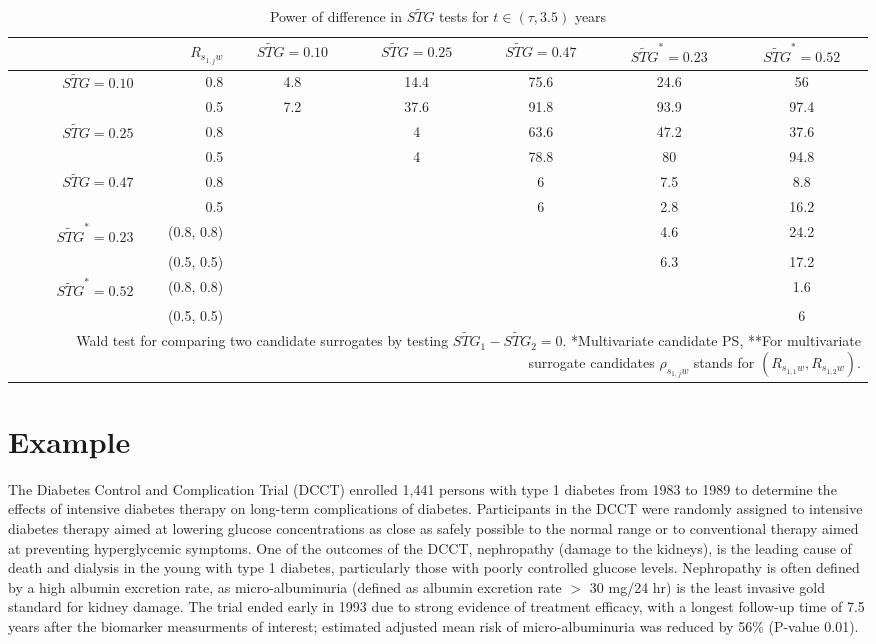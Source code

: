 \documentclass[times, doublespace]{simauth}
\begin{document}
\begin{table}
\begin{center}
\caption{Power of difference in $\widetilde{STG}$ tests for $t \in (\tau, 3.5)$ years \label{IPow}}
\begin{tabular}{rrccccc}
  \hline
 & $R_{s_{1,j}w}$ & $\widetilde{STG}=0.10$  & $\widetilde{STG}=0.25$  & $\widetilde{STG}=0.47$& $\widetilde{STG}^*=0.23$  & $\widetilde{STG}^*=0.52$\\
  \hline
$\widetilde{STG}=0.10$ & 0.8 & 4.8 & 14.4 & 75.6 & 24.6 & 56 \\ 
&  0.5  & 7.2 & 37.6 & 91.8 & 93.9 & 97.4 \\ 
 $\widetilde{STG}=0.25$ & 0.8 &  & 4 & 63.6 & 47.2 & 37.6 \\ 
&  0.5 &  & 4 & 78.8 & 80 & 94.8 \\ 
$\widetilde{STG}=0.47$ & 0.8 &  &  & 6 & 7.5 & 8.8 \\ 
 & 0.5 &  &  & 6 & 2.8 & 16.2 \\ 
$\widetilde{STG}^{*}=0.23$ & (0.8, 0.8) &  &  &  & 4.6 & 24.2 \\ 
&  (0.5, 0.5) &  &  &  & 6.3 & 17.2 \\ 
$\widetilde{STG}^{*}=0.52$ & (0.8, 0.8) &  &  &  &  & 1.6 \\ 
 & (0.5, 0.5) &  &  &  &  & 6 \\ 
   \hline
\multicolumn{7}{p{9in}}{Wald test for comparing two candidate surrogates by testing $\widetilde{STG}_1-\widetilde{STG}_2=0$. *Multivariate candidate PS, **For multivariate surrogate candidates $\rho_{s_{1,j}w}$ stands for $(R_{s_{1,1}w},R_{s_{1,2}w})$.}
\end{tabular}
\end{center}
\end{table}


\section{Example}
The Diabetes Control and Complication Trial (DCCT) enrolled 1,441 persons with type 1 diabetes from 1983 to 1989 to determine the effects of intensive diabetes therapy on long-term complications of diabetes. Participants in the DCCT were randomly assigned to intensive diabetes therapy aimed at lowering glucose concentrations as close as safely possible to the normal range or to conventional therapy aimed at preventing hyperglycemic symptoms. One of the outcomes of the DCCT, nephropathy (damage to the kidneys), is the leading cause of death and dialysis in the young with type 1 diabetes, particularly those with poorly controlled glucose levels. Nephropathy is often defined by a high albumin excretion rate, as micro-albuminuria (defined as albumin excretion rate $>$ 30 mg/24 hr) is the least invasive gold standard for kidney damage. The trial ended early in 1993 due to strong evidence of treatment efficacy, with a longest follow-up time of 7.5 years after the biomarker measurments of interest; estimated adjusted mean risk of micro-albuminuria was reduced by 56\% (P-value 0.01)\citep{DCCT}. 
\end{document}
